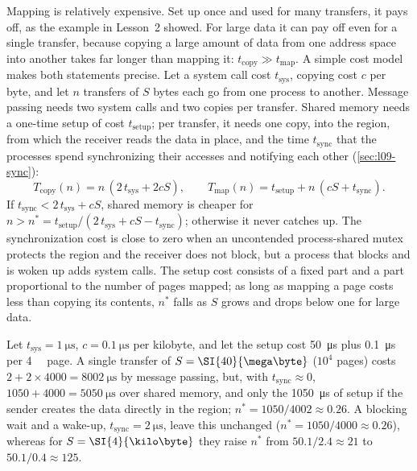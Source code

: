 \documentclass[../main.tex]{subfiles}
\begin{document}
Mapping is relatively expensive.  Set up once and used for many transfers,
it pays off, as the example in Lesson~2 showed.  For large data it can pay
off even for a single transfer, because copying a large amount of data from
one address space into another takes far longer than mapping it:
$t_{\mathrm{copy}} \gg t_{\mathrm{map}}$.  A simple cost model makes both
statements precise.  Let a system call cost $t_{\mathrm{sys}}$, copying cost
$c$ per byte, and let $n$ transfers of $S$ bytes each go from one process to
another.  Message passing needs two system calls and two copies per
transfer.  Shared memory needs a one-time setup of cost
$t_{\mathrm{setup}}$; per transfer, it needs one copy, into the region,
from which the receiver reads the data in place, and the time
$t_{\mathrm{sync}}$ that the processes spend synchronizing their accesses
and notifying each other (\cref{sec:l09-sync}):
\begin{equation}
  T_{\mathrm{copy}}(n) = n\,(2\,t_{\mathrm{sys}} + 2cS) ,
  \qquad
  T_{\mathrm{map}}(n) = t_{\mathrm{setup}} + n\,(cS + t_{\mathrm{sync}}) .
  \label{eq:l09-copy-map}
\end{equation}
If $t_{\mathrm{sync}} < 2\,t_{\mathrm{sys}} + cS$, shared memory is cheaper
for $n > n^{*} = t_{\mathrm{setup}} / (2\,t_{\mathrm{sys}} + cS -
t_{\mathrm{sync}})$; otherwise it never catches up.  The synchronization
cost is close to zero when an uncontended process-shared mutex protects the
region and the receiver does not block, but a process that blocks and is
woken up adds system calls.  The setup cost consists of a fixed part and a
part proportional to the number of pages mapped; as long as mapping a page
costs less than copying its contents, $n^{*}$ falls as $S$ grows and drops
below one for large data.

\begin{example}
  \label{ex:l09-copy-map}
  Let $t_{\mathrm{sys}} = \SI{1}{\micro\second}$,
  $c = \SI{0.1}{\micro\second}$ per kilobyte, and let the setup cost
  \SI{50}{\micro\second} plus \SI{0.1}{\micro\second} per \SI{4}{\kilo\byte}
  page.  A single transfer of $S = \SI{40}{\mega\byte}$ ($10^4$ pages)
  costs $2 + 2 \times 4000 = \SI{8002}{\micro\second}$ by message passing,
  but, with $t_{\mathrm{sync}} \approx 0$, $1050 + 4000 =
  \SI{5050}{\micro\second}$ over shared memory, and only the
  \SI{1050}{\micro\second} of setup if the sender creates the data directly
  in the region; $n^{*} = 1050/4002 \approx 0.26$.  A blocking wait and a
  wake-up, $t_{\mathrm{sync}} = \SI{2}{\micro\second}$, leave this
  unchanged ($n^{*} = 1050/4000 \approx 0.26$), whereas for
  $S = \SI{4}{\kilo\byte}$ they raise $n^{*}$ from $50.1/2.4 \approx 21$ to
  $50.1/0.4 \approx 125$.
\end{example}
\end{document}
